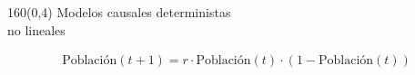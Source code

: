 \documentclass[shownotes,aspectratio=169]{beamer}
\begin{document}
\begin{frame}[plain]
 \begin{textblock}{160}(0,4)
 \centering \LARGE
 Modelos causales deterministas \\  \Large no lineales
\end{textblock}
\vspace{0.75cm}

\begin{align*}
 \text{Población}(t+1) = r \cdot \text{Población}(t)\cdot (1-\text{Población}(t))
\end{align*}

\vspace{0.5cm}

\pause

\centering

 


\end{frame}
\end{document}
